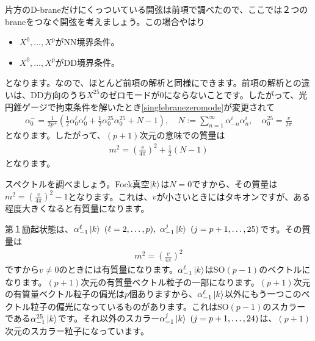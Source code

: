 \documentclass[report,paper=a4, fontsize=12pt, line_length=16cm, number_of_lines=33,dvipdfmx]{jlreq}
\numberwithin{equation}{chapter}
\numberwithin{equation}{section}
\begin{document}
片方のD-braneだけにくっついている開弦は前項で調べたので、ここでは２つのbraneをつなぐ開弦を考えましょう。この場合やはり
\begin{itemize}
  \item $X^0,\dots,X^{p}$がNN境界条件。
  \item $X^0,\dots,X^{p}$がDD境界条件。
\end{itemize}
となります。なので、ほとんど前項の解析と同様にできます。前項の解析との違いは、DD方向のうち$X^{25}$のゼロモードが$0$にならないことです。したがって、光円錐ゲージで拘束条件を解いたとき\eqref{singlebranezeromode}が変更されて
\begin{align}
  \alpha^{-}_{0}=\frac{1}{2p^{+}}\left( \frac12 \alpha_{0}^{\ell}\alpha_{0}^{\ell}+\frac12 \alpha_{0}^{25}\alpha_{0}^{25}+N-1 \right),\quad N:=\sum_{n=1}^{\infty} \alpha_{-n}^{i}\alpha_{n}^{i},\quad \alpha_{0}^{25}=\frac{v}{2\pi}
\end{align}
となります。したがって、$(p+1)$次元の意味での質量は
\begin{align}
  m^2=\left( \frac{v}{4\pi} \right)^2+\frac12(N-1)
\end{align}
となります。

スペクトルを調べましょう。Fock真空$\ket{k}$は$N=0$ですから、その質量は$m^2=\left( \frac{v}{4\pi} \right)^2-1$となります。これは、$v$が小さいときにはタキオンですが、ある程度大きくなると有質量になります。

第１励起状態は、$\alpha_{-1}^{\ell}\ket{k}\  (\ell=2,\dots,p),\ 
\alpha_{-1}^{j}\ket{k}\ (j=p+1,\dots,25)$です。その質量は
\begin{align}
  m^2=\left( \frac{v}{4\pi} \right)^2
\end{align}
ですから$v\ne 0$のときには有質量になります。$\alpha_{-1}^{\ell}\ket{k}$はSO$(p-1)$のベクトルになります。$(p+1)$次元の有質量ベクトル粒子の一部になります。$(p+1)$次元の有質量ベクトル粒子の偏光は$p$個ありますから、$\alpha_{-1}^{\ell}\ket{k}$以外にもう一つこのベクトル粒子の偏光になっているものがあります。これはSO$(p-1)$のスカラーである$\alpha_{-1}^{25}\ket{k}$です。それ以外のスカラー$\alpha_{-1}^{j}\ket{k}\ (j=p+1,\dots,24)$は、$(p+1)$次元のスカラー粒子になっています。
\end{document}
